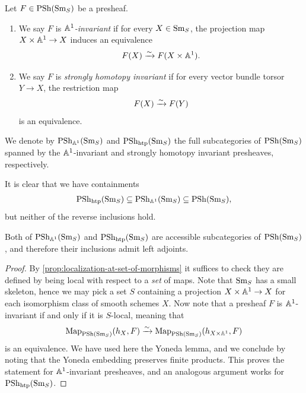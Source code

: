 \documentclass[11pt,openany]{book}
\renewcommand{\Pre}{\mathrm{PSh}}
\begin{document}
\begin{definition} Let $F \in \mathrm{PSh}(\mathrm{Sm}_S)$ be a presheaf.
\begin{enumerate}
    \item We say $F$ is $\mathbb{A}^1$\textit{-invariant} if for every $X \in \mathrm{Sm}_S$, the projection map $X \times \mathbb{A}^1 \to X$ induces an equivalence
    \begin{align*}
        F(X) \xrightarrow{\sim} F(X \times \mathbb{A}^1).
    \end{align*}
    \item We say $F$ is \textit{strongly homotopy invariant} if for every vector bundle torsor $Y \to X$, the restriction map
    \begin{align*}
        F(X) \xrightarrow{\sim} F(Y)
    \end{align*}
    is an equivalence.
\end{enumerate}
We denote by $\Pre_{\A^1}(\Sm_S)$ and $\Pre_{\htp}(\Sm_S)$ the full subcategories of $\Pre(\Sm_S)$ spanned by the $\mathbb{A}^1$-invariant and strongly homotopy invariant presheaves, respectively.
\end{definition}

\begin{remark} It is clear that we have containments
\begin{align*}
    \Pre_{\htp}(\Sm_S) \subseteq \Pre_{\A^1}(\Sm_S) \subseteq \Pre(\Sm_S),
\end{align*}
but neither of the reverse inclusions hold.
\end{remark}

\begin{proposition}\label{prop:shv-and-a1-invariant-presheaves-are-accessible-subcats} 
Both of $\Pre_{\A^1}(\Sm_S)$ and $\Pre_{\htp}(\Sm_S)$ are accessible subcategories of $\Pre(\Sm_S)$, and therefore their inclusions admit left adjoints.
\end{proposition}
\begin{proof} By \autoref{prop:localization-at-set-of-morphisms} it suffices to check they are defined by being local with respect to a \textit{set} of maps. Note that $\mathrm{Sm}_S$ has a small skeleton, hence we may pick a set $S$ containing a projection $X \times \mathbb{A}^1 \to X$ for each isomorphism class of smooth schemes $X$. Now note that
a presheaf $F$ is $\mathbb{A}^1$-invariant if and only if it is $S$-local, meaning that
\begin{align*}
    \mathrm{Map}_{\mathrm{PSh}(\mathrm{Sm}_S)}(h_{X},F) \xrightarrow{\sim} \mathrm{Map}_{\mathrm{PSh}(\mathrm{Sm}_S)}(h_{X \times \mathbb{A}^1},F)
\end{align*}
is an equivalence. We have used here the Yoneda lemma, and we conclude by noting that the Yoneda embedding preserves finite products. This proves the statement for $\mathbb{A}^1$-invariant presheaves, and an analogous argument works for $\Pre_{\htp}(\Sm_S)$.
\end{proof}
\end{document}
